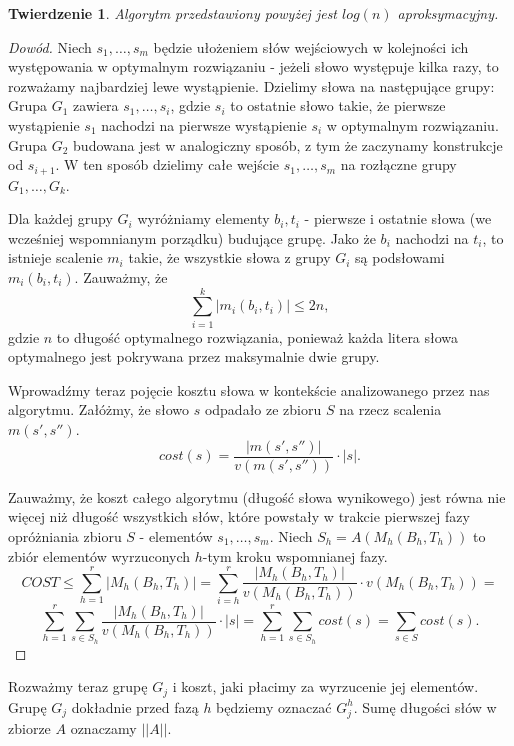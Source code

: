\documentclass[12pt]{article}
\theoremstyle{plain}
\newtheorem*{tw}{Twierdzenie}
\begin{document}
\begin{tw}
Algorytm przedstawiony powyżej jest $log(n)$ aproksymacyjny.
\end{tw}
\begin{proof} [Dowód]
Niech $s_1, \dots, s_m$ będzie ułożeniem słów wejściowych w kolejności ich występowania w optymalnym rozwiązaniu - jeżeli słowo występuje kilka razy, to rozważamy najbardziej lewe wystąpienie. Dzielimy słowa na następujące grupy:
\newline
Grupa $G_1$ zawiera $s_1, \dots, s_i$, gdzie $s_i$ to ostatnie słowo takie, że pierwsze wystąpienie $s_1$ nachodzi na pierwsze wystąpienie $s_i$ w optymalnym rozwiązaniu.
\newline
Grupa $G_2$ budowana jest w analogiczny sposób, z tym że zaczynamy konstrukcje od $s_{i+1}$. W ten sposób dzielimy całe wejście $s_1, \dots, s_m$ na rozłączne grupy $G_1, \dots, G_k$.

Dla każdej grupy $G_i$ wyróżniamy elementy $b_i, t_i$ - pierwsze i ostatnie słowa (we wcześniej wspomnianym porządku) budujące grupę. Jako że $b_i$ nachodzi na $t_i$, to istnieje scalenie $m_i$ takie, że wszystkie słowa z grupy $G_i$ są podsłowami $m_i(b_i, t_i)$.
Zauważmy, że 
$$\sum_{i=1}^{k} |m_i(b_i, t_i)| \leq 2n,$$
gdzie $n$ to długość optymalnego rozwiązania, ponieważ każda litera słowa optymalnego jest pokrywana przez maksymalnie dwie grupy.

Wprowadźmy teraz pojęcie kosztu słowa w kontekście analizowanego przez nas algorytmu. Załóżmy, że słowo $s$ odpadało ze zbioru $S$ na rzecz scalenia $m(s', s'')$. 
$$cost(s) = \frac{|m(s', s'')|}{v(m(s', s''))} \cdot |s|.$$

Zauważmy, że koszt całego algorytmu (długość słowa wynikowego) jest równa nie więcej niż długość wszystkich słów, które powstały w trakcie pierwszej fazy opróżniania zbioru $S$ - elementów $s_1, \dots, s_m$. Niech $S_h = A(M_h(B_h, T_h))$ to zbiór elementów wyrzuconych $h$-tym kroku wspomnianej fazy. 
$$COST \leq \sum_{h=1}^{r} |M_h(B_h, T_h)| = \sum_{i=h}^{r} \frac{|M_h(B_h, T_h)|}{v(M_h(B_h, T_h))} \cdot v(M_h(B_h, T_h))= $$
$$\sum_{h=1}^{r} \sum_{s \in S_h} \frac{|M_h(B_h, T_h)|}{v(M_h(B_h, T_h))} \cdot |s| = \sum_{h=1}^{r} \sum_{s \in S_h} cost(s) = \sum_{s \in S} cost(s).$$
\end{proof}

Rozważmy teraz grupę $G_j$ i koszt, jaki płacimy za wyrzucenie jej elementów. Grupę $G_j$ dokładnie przed fazą $h$ będziemy oznaczać $G_j^{h}$.
Sumę długości słów w zbiorze $A$ oznaczamy $||A||$.
 
\end{document}
